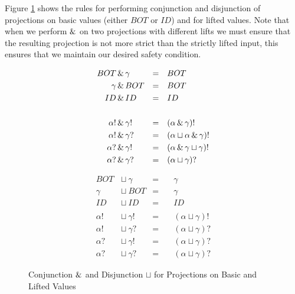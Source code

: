 Figure \ref{fig:conjDisBasic} shows the rules for performing conjunction and
disjunction of projections on basic values (either $BOT$ or $ID$) and for
lifted values. Note that when we perform $\operatorname{\&}$ on two projections with
different lifts we must ensure that the resulting projection is not more strict
than the strictly lifted input, this ensures that we maintain our desired safety
condition.

\begin{figure}
\begin{multicols}{2}
\noindent

\begin{align*}
BOT       &\operatorname{\&}  \gamma        &=&\quad BOT \\
\gamma    &\operatorname{\&}  BOT           &=&\quad BOT \\
ID        &\operatorname{\&}  ID            &=&\quad ID \\
\quad &\             &\ &  \\
\alpha!        &\operatorname{\&}  \gamma!  &=&\quad (\alpha \operatorname{\&} \gamma)! \\
\alpha!        &\operatorname{\&}  \gamma?  &=&\quad (\alpha \sqcup \alpha \operatorname{\&} \gamma)! \\
\alpha?        &\operatorname{\&}  \gamma!  &=&\quad (\alpha \operatorname{\&} \gamma \sqcup \gamma)! \\
\alpha?        &\operatorname{\&}  \gamma?  &=&\quad (\alpha \sqcup \gamma)?
\end{align*}%

\begin{align*}
BOT            &\sqcup\  \gamma   &=&\quad \gamma \\
\gamma         &\sqcup\  BOT      &=&\quad \gamma \\
ID             &\sqcup\  ID       &=&\quad ID \\
\quad \ \quad  &                  &\ & \\
\alpha!        &\sqcup\  \gamma!  &=&\quad (\alpha \sqcup \gamma)! \\
\alpha!        &\sqcup\  \gamma?  &=&\quad (\alpha \sqcup \gamma)? \\
\alpha?        &\sqcup\  \gamma!  &=&\quad (\alpha \sqcup \gamma)? \\
\alpha?        &\sqcup\  \gamma?  &=&\quad (\alpha \sqcup \gamma)?
\end{align*}
\end{multicols}
\caption[Conjunction and Disjunction for Projections 1]{Conjunction $\operatorname{\&}$ and Disjunction $\sqcup$ for Projections on Basic and Lifted Values}
\label{fig:conjDisBasic}
\end{figure}

